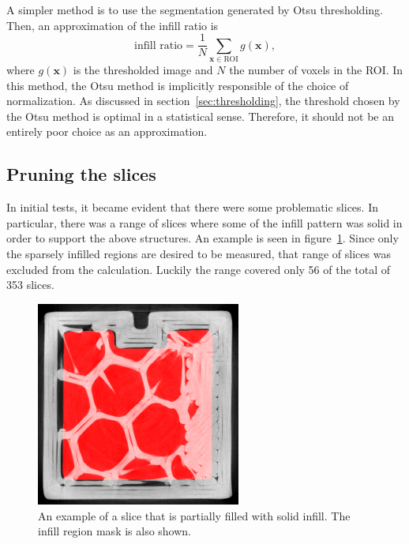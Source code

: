 \documentclass[a4paper,twoside,12pt]{article}
\begin{document}
A simpler method is to use the segmentation generated by Otsu thresholding. Then, an approximation of the infill ratio is
\begin{equation}
    \label{eq:infill_ratio}
    \text{infill ratio} = \frac{1}{N} \sum\limits_{\mathbf{x} \in \text{ROI}} g(\mathbf{x}),
\end{equation}
where $g(\mathbf{x})$ is the thresholded image and $N$ the number of voxels in the ROI. In this method, the Otsu method is implicitly responsible of the choice of normalization. As discussed in section~\ref{sec:thresholding}, the threshold chosen by the Otsu method is optimal in a statistical sense. Therefore, it should not be an entirely poor choice as an approximation.

\subsection{Pruning the slices}
In initial tests, it became evident that there were some problematic slices. In particular, there was a range of slices where some of the infill pattern was solid in order to support the above structures. An example is seen in figure~\ref{fig:solid_infill}. Since only the sparsely infilled regions are desired to be measured, that range of slices was excluded from the calculation. Luckily the range covered only 56 of the total of 353 slices.
\begin{figure}
    \centering
    \includegraphics[width=0.6\textwidth]{images/eroded_71.png}
    \caption{An example of a slice that is partially filled with solid infill. The infill region mask is also shown.}
    \label{fig:solid_infill}
\end{figure}
\end{document}
